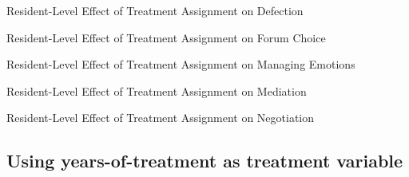 \documentclass[10pt]{article}
\begin{document}
\begin{table}[H]
\caption{Resident-Level Effect of Treatment Assignment on Defection}
\begin{center}
\begin{adjustbox}{max width = \textwidth}

\end{adjustbox}
\end{center}
\end{table}

\begin{table}[H]
\caption{Resident-Level Effect of Treatment Assignment on Forum Choice}
\begin{center}

\end{center}
\end{table}


\begin{table}[H]
\caption{Resident-Level Effect of Treatment Assignment on Managing Emotions}
\begin{center}
\begin{adjustbox}{max width = \textwidth}

\end{adjustbox}
\end{center}
\end{table}

\begin{table}[H]
\caption{Resident-Level Effect of Treatment Assignment on Mediation}
\begin{center}
\begin{adjustbox}{max width = \textwidth}

\end{adjustbox}
\end{center}
\end{table}

\begin{table}[H]
\caption{Resident-Level Effect of Treatment Assignment on Negotiation}
\begin{center}
\begin{adjustbox}{max width = \textwidth}

\end{adjustbox}
\end{center}
\end{table}

\subsection{Using years-of-treatment as treatment variable}
\end{document}
